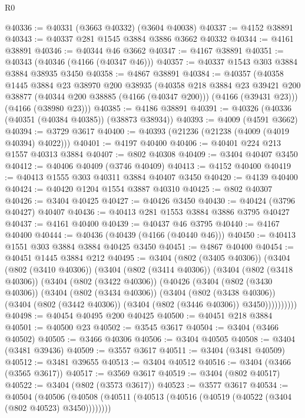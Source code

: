 \begin{lexlean}{R0}
\begin{coremodule}
@40336 := @40331 (@3663 @40332) (@3604 @40038)
@40337 := @4152 @38891
@40343 := @40337 @281 @1545 @3884 @3886 @3662 @40332
@40344 := @4161 @38891
@40346 := @40344 @46 @3662
@40347 := @4167 @38891
@40351 := @40343 (@40346 (@4166 (@40347 @46)))
@40357 := @40337 @1543 @303 @3884 @3884 @38935 @3450
@40358 := @4867 @38891
@40384 := @40357
    (@40358
      @1445
      @3884
      @23
      @38970
      @200
      @38935
      (@40358
        @218
        @3884
        @23
        @39421
        @200
        @38877
        (@40344 @200 @38885 (@4166 (@40347 @200)))
        (@4166 (@39431 @23)))
      (@4166 (@38980 @23)))
@40385 := @4186 @38891
@40391 := @40326 (@40336 (@40351 (@40384 @40385)) (@38873 @38934))
@40393 := @4009 (@4591 @3662)
@40394 := @3729 @3617
@40400 := @40393 (@21236 (@21238 (@4009 (@4019 @40394) @4022)))
@40401 := @4197 @40400
@40406 := @40401 @224 @213 @1557 @40313 @3884
@40407 := @802 @40308
@40409 := @3404 @40407 @3450
@40412 := @40406 @40409 (@3746 @40409)
@40413 := @4152 @40400
@40419 := @40413 @1555 @303 @40311 @3884 @40407 @3450
@40420 := @4139 @40400
@40424 := @40420 @1204 @1554 @3887 @40310
@40425 := @802 @40307
@40426 := @3404 @40425
@40427 := @40426 @3450
@40430 := @40424 (@3796 @40427) @40407
@40436 := @40413 @281 @1553 @3884 @3886 @3795 @40427
@40437 := @4161 @40400
@40439 := @40437 @46 @3795
@40440 := @4167 @40400
@40444 := @40436 (@40439 (@4166 (@40440 @46)))
@40450 := @40413 @1551 @303 @3884 @3884 @40425 @3450
@40451 := @4867 @40400
@40454 := @40451 @1445 @3884 @212
@40495 := @3404
    (@802 (@3405 @40306))
    (@3404
      (@802 (@3410 @40306))
      (@3404
        (@802 (@3414 @40306))
        (@3404
          (@802 (@3418 @40306))
          (@3404
            (@802 (@3422 @40306))
            (@40426
              (@3404
                (@802 (@3430 @40306))
                (@3404
                  (@802 (@3434 @40306))
                  (@3404
                    (@802 (@3438 @40306))
                    (@3404 (@802 (@3442 @40306)) (@3404 (@802 (@3446 @40306)) @3450))))))))))
@40498 := @40454 @40495 @200 @40425
@40500 := @40451 @218 @3884
@40501 := @40500 @23
@40502 := @3545 @3617
@40504 := @3404 (@3466 @40502)
@40505 := @3466 @40306
@40506 := @3404 @40505
@40508 := @3404 (@3481 @39436)
@40509 := @3557 @3617
@40511 := @3404 (@3481 @40509)
@40512 := @3481 @39655
@40513 := @3404 @40512
@40516 := @3404 (@3466 (@3565 @3617))
@40517 := @3569 @3617
@40519 := @3404 (@802 @40517)
@40522 := @3404 (@802 (@3573 @3617))
@40523 := @3577 @3617
@40534 := @40504
    (@40506 (@40508 (@40511 (@40513 (@40516 (@40519 (@40522 (@3404 (@802 @40523) @3450))))))))

\end{coremodule}
\end{lexlean}
